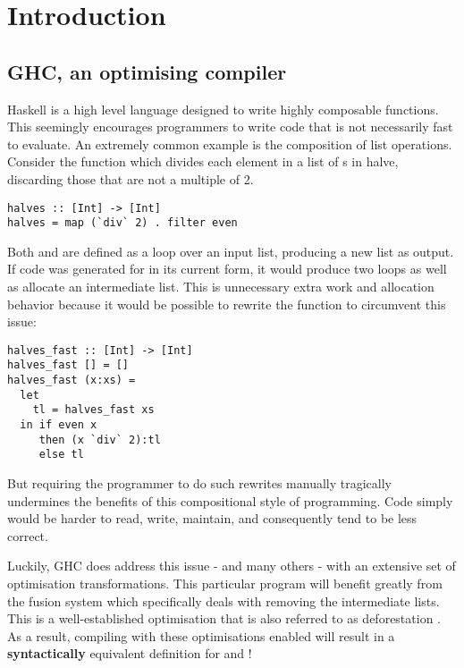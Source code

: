 \chapter{Introduction}

\section{GHC, an optimising compiler}

Haskell is a high level language designed to write highly composable functions.
This seemingly encourages programmers to write code that
is not necessarily fast to evaluate. An extremely common example is the composition
of list operations. Consider the function  which divides each element
in a list of s in halve, discarding those that are not a multiple of 2.

\begin{listing}[H]
\begin{verbatim}
halves :: [Int] -> [Int]
halves = map (`div` 2) . filter even
\end{verbatim}
\end{listing}

Both  and  are defined as a loop over an input list, producing a new list as output. 
If code was generated for  in its current form, it would produce two loops as well as allocate
an intermediate list. This is unnecessary extra work and allocation behavior because
it would be possible to rewrite the function to circumvent this issue:


\begin{listing}[H]
\begin{verbatim}
halves_fast :: [Int] -> [Int]
halves_fast [] = []
halves_fast (x:xs) = 
  let 
    tl = halves_fast xs 
  in if even x 
     then (x `div` 2):tl
     else tl
\end{verbatim}
\end{listing}

But requiring the programmer to do such rewrites manually tragically undermines
the benefits of this compositional style of programming. Code simply would be harder to read, write,
maintain, and consequently tend to be less correct. 

Luckily, GHC does address this issue - and many others - with an extensive set of optimisation transformations.
This particular program will benefit greatly from the fusion system which specifically deals with removing
the intermediate lists. This is a well-established optimisation that is also referred to as deforestation \cite{WADLER1990231}.
As a result, compiling with these optimisations enabled will result in a \textbf{syntactically} equivalent
definition for  and ! 

